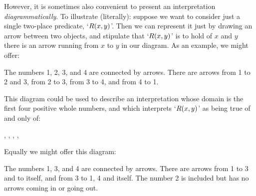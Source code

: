 However, it is sometimes also convenient to present an interpretation
\emph{diagrammatically}. To illustrate (literally): suppose we want to
consider just a single two-place predicate, `$\mathord{R}(x,y)$'. Then we
can represent it just by drawing an arrow between two objects, and
stipulate that `$\mathord{R}(x,y)$' is to hold of $x$ and $y$ \ifeff{} there is an arrow running from $x$ to $y$ in our diagram. As an
example, we might offer:
\begin{center}
\begin{arialabel}{The numbers 1, 2, 3, and 4 are connected
	by arrows. There are arrows from 1 to 2 and 3, from 2 to 3, from 3 to
	4, and from 4 to 1.}
\end{arialabel}
\end{center}
This diagram could be used to describe an interpretation whose domain is the first four positive whole numbers, and which interprets `$\mathord{R}(x,y)$' as being true of and only of:
	\begin{center}
		, 
		, 
		, 
		, 
	\end{center}
Equally we might offer this diagram:

\begin{center}
\begin{arialabel}{The numbers 1, 3, and 4 are connected by arrows.
There are arrows from 1 to 3 and to itself, and from 3 to 1, 4 and itself. The number 2 is included but has no arrows coming in or going out.}
\end{arialabel}
\end{center}

